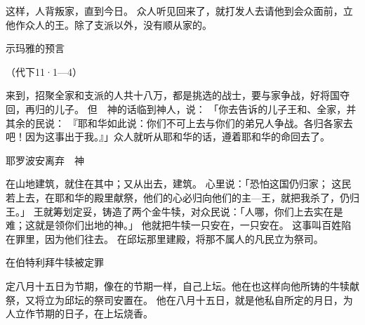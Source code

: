 {这样，{}人背叛{}家，直到今日。
众人听见{}回来了，就打发人去请他到会众面前，立他作{}众人的王。除了{}支派以外，没有顺从{}家的。
\par }{\SH 示玛雅的预言
\par }{\R （代下11·1—4）
\par }{\PP {}来到{}，招聚{}全家和{}支派的人共十八万，都是挑选的战士，要与{}家争战，好将国夺回，再归{}的儿子{}。
但　神的话临到神人{}，说：
「你去告诉{}的儿子{}王{}和{}、{}全家，并其余的民说：
『耶和华如此说：你们不可上去与你们的弟兄{}人争战。各归各家去吧！因为这事出于我。』」众人就听从耶和华的话，遵着耶和华的命回去了。
\par }{\SH 耶罗波安离弃　神
\par }{\PP {}在{}山地建筑{}，就住在其中；又从{}出去，建筑{}。
心里说：「恐怕这国仍归{}家；
这民若上{}去，在耶和华的殿里献祭，他们的心必归向他们的主—{}王{}，就把我杀了，仍归{}王{}。」
王就筹划定妥，铸造了两个金牛犊，对众民说：「{}人哪，你们上{}去实在是难；这就是领你们出{}地的神。」
他就把牛犊一只安在{}，一只安在{}。
这事叫百姓陷在罪里，因为他们往{}去{}。
在邱坛那里建殿，将那不属{}人的凡民立为祭司。
\par }{\SH 在伯特利拜牛犊被定罪
\par }{\PP {}定八月十五日为节期，像在{}的节期一样，自己上坛{}。他在{}也这样向他所铸的牛犊献祭，又将立为邱坛的祭司安置在{}。
他在八月十五日，就是他私自所定的月日，为{}人立作节期的日子，在{}上坛烧香。

}
